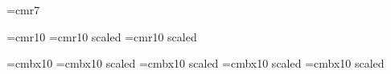 \font\fwfontnote=cmr7

\font\fwfontnorm=cmr10
\font\fwfontnorma=cmr10 scaled 
\font\fwfontnormb=cmr10 scaled 

\font\fwfontbold=cmbx10
\font\fwfontbolda=cmbx10 scaled 
\font\fwfontboldb=cmbx10 scaled 
\font\fwfontboldc=cmbx10 scaled 
\font\fwfontboldd=cmbx10 scaled 



\def\fwbeginmacro{\fwparskipoff\bigskip}
\def\fwendmacro{\fwparskipon\par}

\def\fwmacroname#1#2{{\sl #1\/}$\lbrack$#2$\rbrack$}
\def\fwfilename#1#2{{\bf #1}$\lbrack$#2$\rbrack$}
\def\fwzero#1{{\bf Z}}
\def\fwmany#1{{\bf M}}
\def\fwequals{ $\equiv$}
\def\fwplusequals{ $+\equiv$}

\def\fwodef{\parindent=15pt\vskip0pt$\lbrace$\parindent=20pt}
\def\fwcdef{$\rbrace$\vskip0pt\parindent=0pt}
\def\fwoquote{`}
\def\fwcquote{'}
\def\fwoparen{$($}
\def\fwcomma{$,$}
\def\fwcparen{$)$}
\def\fwparam#1{$\diamond #1$}
\def\fwparams#1{$(\diamond #1)$}

\def\fwbeginmacronotes{\begingroup\baselineskip=9pt\smallskip}
\def\fwnote#1{{\fwfontnote #1}\par}
\def\fwisafile#1{\fwnote{#1}}
\def\fwusedin#1{\fwnote{#1}}
\def\fwseealso#1{\fwnote{#1}}
\def\fwendmacronotes{\endgroup}


